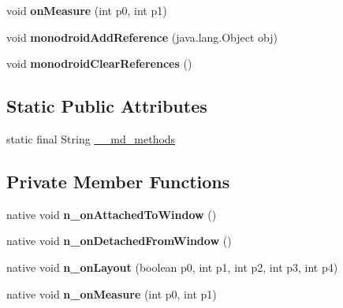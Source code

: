 \begin{DoxyCompactItemize}
void {\bfseries on\+Measure} (int p0, int p1)
\item 
\mbox{\label{classmd5b60ffeb829f638581ab2bb9b1a7f4f3f_1_1CarouselPageRenderer_a3887bda40516040ce44ded44b90eed5a}} 
void {\bfseries monodroid\+Add\+Reference} (java.\+lang.\+Object obj)
\item 
\mbox{\label{classmd5b60ffeb829f638581ab2bb9b1a7f4f3f_1_1CarouselPageRenderer_ae1977d178a6be8e92ddec489238ad42a}} 
void {\bfseries monodroid\+Clear\+References} ()
\end{DoxyCompactItemize}
\subsection*{Static Public Attributes}
\begin{DoxyCompactItemize}
\item 
static final String \hyperlink{classmd5b60ffeb829f638581ab2bb9b1a7f4f3f_1_1CarouselPageRenderer_aa7c3e4156a49e5c3fe304722e1b5019c}{\+\_\+\+\_\+md\+\_\+methods}
\end{DoxyCompactItemize}
\subsection*{Private Member Functions}
\begin{DoxyCompactItemize}
\item 
\mbox{\label{classmd5b60ffeb829f638581ab2bb9b1a7f4f3f_1_1CarouselPageRenderer_a67fa6f1acff5e8db91344ca99760b07f}} 
native void {\bfseries n\+\_\+on\+Attached\+To\+Window} ()
\item 
\mbox{\label{classmd5b60ffeb829f638581ab2bb9b1a7f4f3f_1_1CarouselPageRenderer_a1afc838401eaec1464487a0b2ef4b20a}} 
native void {\bfseries n\+\_\+on\+Detached\+From\+Window} ()
\item 
\mbox{\label{classmd5b60ffeb829f638581ab2bb9b1a7f4f3f_1_1CarouselPageRenderer_a2efb0f1874a6cb3040c950ab5e63022a}} 
native void {\bfseries n\+\_\+on\+Layout} (boolean p0, int p1, int p2, int p3, int p4)
\item 
\mbox{\label{classmd5b60ffeb829f638581ab2bb9b1a7f4f3f_1_1CarouselPageRenderer_a8b749d1c9355603a40cba3be0b3b1c0f}} 
native void {\bfseries n\+\_\+on\+Measure} (int p0, int p1)
\end{DoxyCompactItemize}
